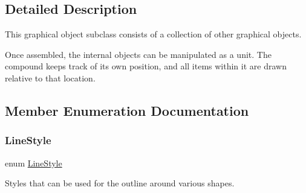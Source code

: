 \subsection{Detailed Description}
This graphical object subclass consists of a collection of other graphical objects. 

Once assembled, the internal objects can be manipulated as a unit. The compound keeps track of its own position, and all items within it are drawn relative to that location. 

\subsection{Member Enumeration Documentation}
\mbox{\label{classsgl_1_1GObject_a86e0f5648542856159bb40775c854aa7}} 
\subsubsection{\texorpdfstring{Line\+Style}{LineStyle}}
{\footnotesize\ttfamily enum \mbox{\hyperlink{classsgl_1_1GObject_a86e0f5648542856159bb40775c854aa7}{Line\+Style}}\hspace{0.3cm}{\ttfamily [inherited]}}



Styles that can be used for the outline around various shapes. 

